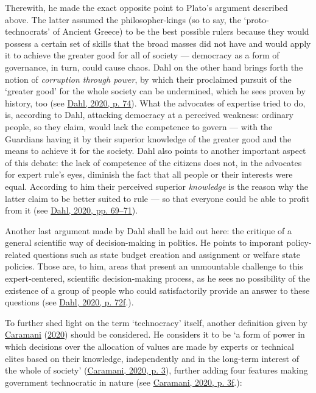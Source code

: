 \documentclass[
  12pt,
  english,
]{article}
\begin{document}
Therewith, he made the exact opposite point to Plato's argument
described above. The latter assumed the philosopher-kings (so to say,
the `proto-technocrats' of Ancient Greece) to be the best possible
rulers because they would possess a certain set of skills that the broad
masses did not have and would apply it to achieve the greater good for
all of society --- democracy as a form of governance, in turn, could
cause chaos. Dahl on the other hand brings forth the notion of
\emph{corruption through power}, by which their proclaimed pursuit of
the `greater good' for the whole society can be undermined, which he
sees proven by history, too (see
\protect\hyperlink{ref-dahl_onDemocracy}{Dahl, 2020, p. 74}). What the
advocates of expertise tried to do, is, according to Dahl, attacking
democracy at a perceived weakness: ordinary people, so they claim, would
lack the competence to govern --- with the Guardians having it by their
superior knowledge of the greater good and the means to achieve it for
the society. Dahl also points to another important aspect of this
debate: the lack of competence of the citizens does not, in the
advocates for expert rule's eyes, diminish the fact that all people or
their interests were equal. According to him their perceived superior
\emph{knowledge} is the reason why the latter claim to be better suited
to rule --- so that everyone could be able to profit from it (see
\protect\hyperlink{ref-dahl_onDemocracy}{Dahl, 2020, pp. 69--71}).

Another last argument made by Dahl shall be laid out here: the critique
of a general scientific way of decision-making in politics. He points to
imporant policy-related questions such as state budget creation and
assignment or welfare state policies. Those are, to him, areas that
present an unmountable challenge to this expert-centered, scientific
decision-making process, as he sees no possibility of the existence of a
group of people who could satisfactorily provide an answer to these
questions (see \protect\hyperlink{ref-dahl_onDemocracy}{Dahl, 2020, p.
72f}.).

To further shed light on the term `technocracy' itself, another
definition given by
\protect\hyperlink{ref-caramani2020technocratic}{Caramani}
(\protect\hyperlink{ref-caramani2020technocratic}{2020}) should be
considered. He considers it to be `a form of power in which decisions
over the allocation of values are made by experts or technical elites
based on their knowledge, independently and in the long-term interest of
the whole of society'
(\protect\hyperlink{ref-caramani2020technocratic}{Caramani, 2020, p.
3}), further adding four features making government technocratic in
nature (see \protect\hyperlink{ref-caramani2020technocratic}{Caramani,
2020, p. 3f}.):
\end{document}
